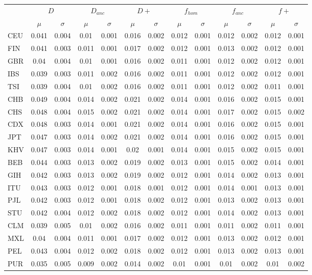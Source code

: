 \begin{tabular}{@{}lcccccccccccc@{}}
\toprule
 & \multicolumn{2}{c}{$D$} & \multicolumn{2}{c}{$D_{anc}$} & \multicolumn{2}{c}{$D+$} & \multicolumn{2}{c}{$f_{hom}$} & \multicolumn{2}{c}{$f_{anc}$} & \multicolumn{2}{c}{$f+$} \\
\cmidrule(lr){2-3} \cmidrule(lr){4-5} \cmidrule(lr){6-7} \cmidrule(lr){8-9} \cmidrule(lr){10-11} \cmidrule(lr){12-13}
 & $\mu$ & $\sigma$ & $\mu$ & $\sigma$ & $\mu$ & $\sigma$ & $\mu$ & $\sigma$ & $\mu$ & $\sigma$ & $\mu$ & $\sigma$ \\
\midrule
CEU & 0.041 & 0.004 & 0.01 & 0.001 & 0.016 & 0.002 & 0.012 & 0.001 & 0.012 & 0.002 & 0.012 & 0.001 \\
FIN & 0.041 & 0.003 & 0.011 & 0.001 & 0.017 & 0.002 & 0.012 & 0.001 & 0.013 & 0.002 & 0.012 & 0.001 \\
GBR & 0.04 & 0.004 & 0.01 & 0.001 & 0.016 & 0.002 & 0.011 & 0.001 & 0.012 & 0.002 & 0.012 & 0.001 \\
IBS & 0.039 & 0.003 & 0.011 & 0.002 & 0.016 & 0.002 & 0.011 & 0.001 & 0.012 & 0.002 & 0.012 & 0.001 \\
TSI & 0.039 & 0.004 & 0.01 & 0.002 & 0.016 & 0.002 & 0.011 & 0.001 & 0.012 & 0.002 & 0.011 & 0.001 \\
CHB & 0.049 & 0.004 & 0.014 & 0.002 & 0.021 & 0.002 & 0.014 & 0.001 & 0.016 & 0.002 & 0.015 & 0.001 \\
CHS & 0.048 & 0.004 & 0.015 & 0.002 & 0.021 & 0.002 & 0.014 & 0.001 & 0.017 & 0.002 & 0.015 & 0.002 \\
CDX & 0.048 & 0.003 & 0.014 & 0.001 & 0.021 & 0.002 & 0.014 & 0.001 & 0.016 & 0.002 & 0.015 & 0.001 \\
JPT & 0.047 & 0.003 & 0.014 & 0.002 & 0.021 & 0.002 & 0.014 & 0.001 & 0.016 & 0.002 & 0.015 & 0.001 \\
KHV & 0.047 & 0.003 & 0.014 & 0.001 & 0.02 & 0.001 & 0.014 & 0.001 & 0.015 & 0.002 & 0.015 & 0.001 \\
BEB & 0.044 & 0.003 & 0.013 & 0.002 & 0.019 & 0.002 & 0.013 & 0.001 & 0.015 & 0.002 & 0.014 & 0.001 \\
GIH & 0.042 & 0.003 & 0.013 & 0.002 & 0.019 & 0.002 & 0.012 & 0.001 & 0.014 & 0.002 & 0.013 & 0.001 \\
ITU & 0.043 & 0.003 & 0.012 & 0.001 & 0.018 & 0.001 & 0.012 & 0.001 & 0.014 & 0.001 & 0.013 & 0.001 \\
PJL & 0.042 & 0.003 & 0.012 & 0.001 & 0.018 & 0.002 & 0.012 & 0.001 & 0.013 & 0.002 & 0.013 & 0.001 \\
STU & 0.042 & 0.004 & 0.012 & 0.002 & 0.018 & 0.002 & 0.012 & 0.001 & 0.014 & 0.002 & 0.013 & 0.001 \\
CLM & 0.039 & 0.005 & 0.01 & 0.002 & 0.016 & 0.002 & 0.011 & 0.001 & 0.011 & 0.002 & 0.011 & 0.001 \\
MXL & 0.04 & 0.004 & 0.011 & 0.001 & 0.017 & 0.002 & 0.012 & 0.001 & 0.013 & 0.002 & 0.012 & 0.001 \\
PEL & 0.043 & 0.004 & 0.012 & 0.002 & 0.018 & 0.002 & 0.012 & 0.001 & 0.013 & 0.002 & 0.013 & 0.001 \\
PUR & 0.035 & 0.005 & 0.009 & 0.002 & 0.014 & 0.002 & 0.01 & 0.001 & 0.01 & 0.002 & 0.01 & 0.002 \\
\bottomrule
\end{tabular}

